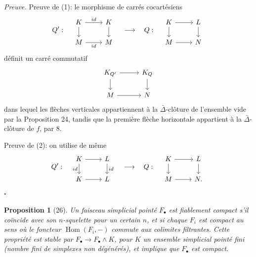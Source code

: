 \documentclass[11pt]{article}
\newcommand{\Hom}{\operatorname{Hom}}
\theoremstyle{deligne}
\newtheorem*{proposition*}{Proposition}
\newenvironment{proofdel}{\noindent\textit{Preuve.}}{\hfill$\square$}
\begin{document}
\begin{proofdel}
Preuve de (1): le morphisme de carrés cocartésiens
\[
Q':\quad
\begin{tikzcd}[column sep=2.4em,row sep=1.5em]
K \arrow[r,"id"] \arrow[d] & K \arrow[d] \\
M \arrow[r,"id"'] & M
\end{tikzcd}
\quad\longrightarrow\quad
Q:\quad
\begin{tikzcd}[column sep=2.4em,row sep=1.5em]
K \arrow[r] \arrow[d] & L \arrow[d] \\
M \arrow[r] & N
\end{tikzcd}
\]
définit un carré commutatif
\[
\begin{tikzcd}[column sep=2.8em,row sep=1.6em]
K_{Q'} \arrow[r] \arrow[d] & K_Q \arrow[d] \\
M \arrow[r] & N
\end{tikzcd}
\]
dans lequel les flèches verticales appartiennent à la \(\bar\Delta\)-clôture de l'ensemble vide par la Proposition 24, tandis que la première flèche horizontale appartient à la \(\bar\Delta\)-clôture de \(f\), par 8.

Preuve de (2): on utilise de même
\[
Q':\quad
\begin{tikzcd}[column sep=2.4em,row sep=1.5em]
K \arrow[r] \arrow[d,"id"'] & L \arrow[d,"id"] \\
K \arrow[r] & L
\end{tikzcd}
\quad\longrightarrow\quad
Q:\quad
\begin{tikzcd}[column sep=2.4em,row sep=1.5em]
K \arrow[r] \arrow[d] & L \arrow[d] \\
M \arrow[r] & N .
\end{tikzcd}
\]
\end{proofdel}

\begin{proposition*}[26]
Un faisceau simplicial pointé \(F_\bullet\) est fiablement compact s'il coïncide avec son \(n\)-squelette pour un certain \(n\), et si chaque \(F_i\) est compact au sens où le foncteur \(\Hom(F_i,-)\) commute aux colimites filtrantes. Cette propriété est stable par \(F_\bullet\to F_\bullet\wedge K\), pour \(K\) un ensemble simplicial pointé fini (nombre fini de simplexes non dégénérés), et implique que \(F_\bullet\) est compact.
\end{proposition*}
\end{document}
